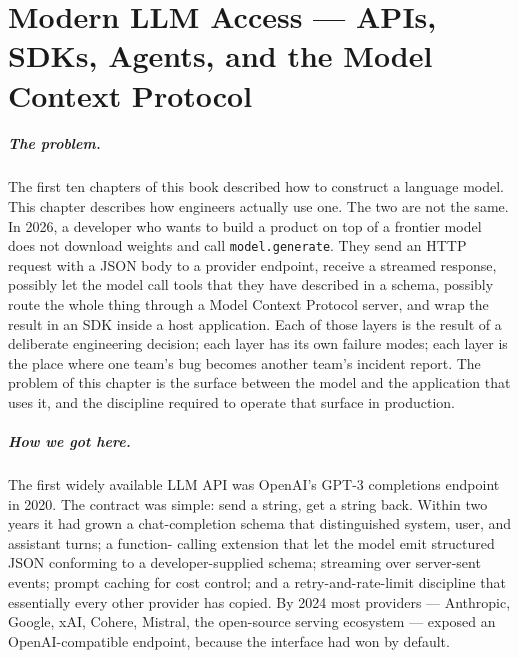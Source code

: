 \chapter{Modern LLM Access --- APIs, SDKs, Agents, and the Model Context Protocol}
\label{chap:agents}

\scenelabel
\begin{scenestrip}
\end{scenestrip}

\paragraph{The problem.}
The first ten chapters of this book described how to construct a
language model. This chapter describes how engineers actually use
one. The two are not the same. In 2026, a developer who wants to
build a product on top of a frontier model does not download
weights and call \texttt{model.generate}. They send an HTTP request
with a JSON body to a provider endpoint, receive a streamed
response, possibly let the model call tools that they have
described in a schema, possibly route the whole thing through a
Model Context Protocol server, and wrap the result in an SDK
inside a host application. Each of those layers is the result of
a deliberate engineering decision; each layer has its own failure
modes; each layer is the place where one team's bug becomes another
team's incident report. The problem of this chapter is the surface
between the model and the application that uses it, and the
discipline required to operate that surface in production.

\paragraph{How we got here.}
The first widely available LLM API was OpenAI's GPT-3 completions
endpoint in 2020. The contract was simple: send a string, get a
string back. Within two years it had grown a chat-completion schema
that distinguished system, user, and assistant turns; a function-
calling extension that let the model emit structured JSON conforming
to a developer-supplied schema; streaming over server-sent events;
prompt caching for cost control; and a retry-and-rate-limit
discipline that essentially every other provider has copied. By
2024 most providers --- Anthropic, Google, xAI, Cohere, Mistral,
the open-source serving ecosystem --- exposed an OpenAI-compatible
endpoint, because the interface had won by default.

